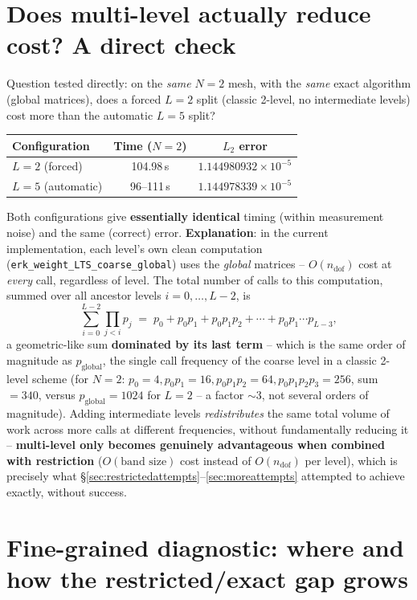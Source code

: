 \documentclass[11pt]{article}
\begin{document}
\section{Does multi-level actually reduce cost? A direct check}
\label{sec:l2vsl5}

Question tested directly: on the \emph{same} $N=2$ mesh, with the
\emph{same} exact algorithm (global matrices), does a forced $L=2$
split (classic 2-level, no intermediate levels) cost more than the
automatic $L=5$ split?

\begin{center}
\begin{tabular}{@{}lcc@{}}
\toprule
Configuration & Time ($N=2$) & $L_2$ error \\
\midrule
$L=2$ (forced) & 104.98\,s & $1.144980932\times10^{-5}$ \\
$L=5$ (automatic) & 96--111\,s & $1.144978339\times10^{-5}$ \\
\bottomrule
\end{tabular}
\end{center}

Both configurations give \textbf{essentially identical} timing (within
measurement noise) and the same (correct) error. \textbf{Explanation}:
in the current implementation, each level's own \og clean \fg{}
computation (\texttt{erk\_weight\_LTS\_coarse\_global}) uses the
\emph{global} matrices -- $O(n_{\text{dof}})$ cost at \emph{every} call,
regardless of level. The total number of calls to this computation,
summed over all ancestor levels $i=0,\dots,L-2$, is
\[
  \sum_{i=0}^{L-2} \prod_{j<i} p_j \;=\; p_0 + p_0 p_1 + p_0 p_1 p_2 + \cdots + p_0 p_1 \cdots p_{L-3} ,
\]
a geometric-like sum \textbf{dominated by its last term} -- which is
the same order of magnitude as $p_{\text{global}}$, the single call
frequency of the coarse level in a classic 2-level scheme (for $N=2$:
$p_0{=}4, p_0p_1{=}16, p_0p_1p_2{=}64, p_0p_1p_2p_3{=}256$, sum $=340$,
versus $p_{\text{global}}{=}1024$ for $L=2$ -- a factor $\sim$3, not
several orders of magnitude). Adding intermediate levels
\emph{redistributes} the same total volume of work across more calls
at different frequencies, without fundamentally reducing it --
\textbf{multi-level only becomes genuinely advantageous when combined
with restriction} ($O(\text{band size})$ cost instead of
$O(n_{\text{dof}})$ per level), which is precisely what
\S\ref{sec:restrictedattempts}--\ref{sec:moreattempts} attempted to
achieve exactly, without success.

\section{Fine-grained diagnostic: where and how the restricted/exact gap grows}
\label{sec:diagn2}
\end{document}
